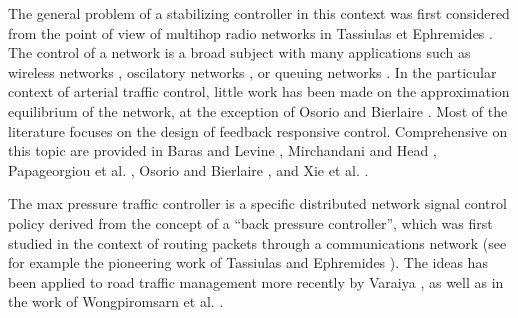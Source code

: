The general problem of a stabilizing controller in this context was first considered from the point of view of multihop radio networks in Tassiulas et Ephremides \cite{MaxPressureOriginal}. The control of a network is a broad subject with many applications such as wireless networks \cite{StabRelayNetworks}\cite{ControlWireless}, oscilatory networks \cite{SynchroComplexNetworks}, or queuing networks \cite{MultiQueues}\cite{CDC03OptSwitch}. In the particular context of arterial traffic control, little work has been made on the approximation equilibrium of the network, at the exception of Osorio and Bierlaire \cite{ModelSignalOpt}\cite{ModelFiniteNetwork}. Most of the literature focuses on the design of feedback responsive control. Comprehensive on this topic are provided in
Baras and Levine \cite{NetworkBarasOne}\cite{NetworkBarasTwo}, Mirchandani and Head \cite{Mirchandani}, Papageorgiou et al. \cite{Papageorgiou}, Osorio and Bierlaire \cite{ModelSignalOpt}, and Xie et al. \cite{Xie}.

The max pressure traffic controller \cite{MaxPressureStochastic} is a specific distributed network signal control policy derived from the concept of a ``back pressure controller'', which was first studied in the context of routing packets through a communications network (see for example the pioneering work of Tassiulas and Ephremides \cite{MaxPressureOriginal}). The ideas has been applied to road traffic management more recently by Varaiya \cite{MaxPressureStochastic}, as well as in the work of Wongpiromsarn et al. \cite{MaxPressureStochasticConcurrent}. 



